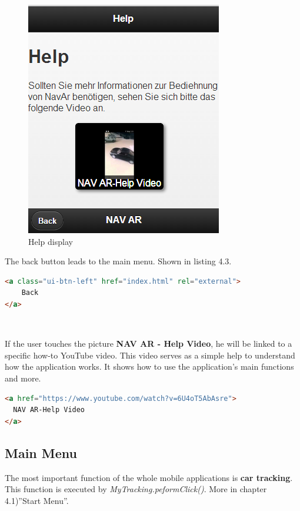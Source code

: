 \begin{figure}[h]
\centering
\includegraphics[width=0.5\linewidth]{graphics/chapter4/2}
\caption{Help display}
\end{figure}



\newpage
The back button leads to the main menu. Shown in listing 4.3.
\begin{lstlisting}[language=html, caption= 
Back button,captionpos=b]
<a class="ui-btn-left" href="index.html" rel="external">
	Back
</a>
\end{lstlisting}
\
\


If the user touches the picture \textbf{NAV AR - Help Video}, he will be linked to a specific how-to YouTube video. This video serves as a simple help to understand how the application works. It shows how to use the application's main functions and more.
\\

\begin{lstlisting}[language=html, caption= 
Help video,captionpos=b]
<a href="https://www.youtube.com/watch?v=6U4oT5AbAsre">
  NAV AR-Help Video
</a>
\end{lstlisting}


\newpage
\subsection{Main Menu}
The most important function of the whole mobile applications is \textbf{car tracking}. This function is executed by \textit{MyTracking.peformClick()}. More in chapter 4.1)''Start Menu''.
\\


